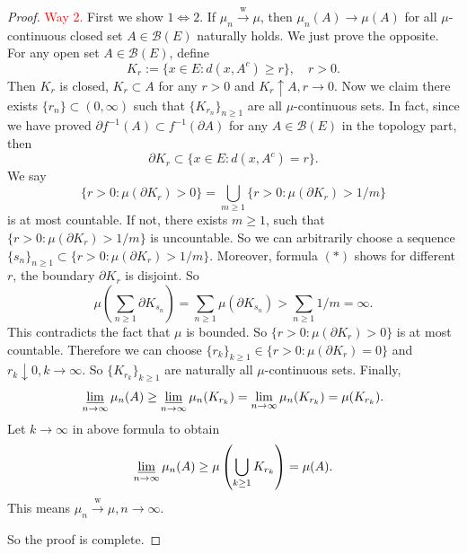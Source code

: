 \documentclass[12pt]{article}
\renewcommand{\b}{\mathscr{B}}
\renewcommand{\(}{\left(}%
\renewcommand{\)}{\right)}%
\renewcommand{\[}{\left[}%
\renewcommand{\]}{\right]}%
\newtheorem{proof}{Proof.}}
\begin{document}
\begin{proof}
    \textcolor{red}{\sffamily Way 2.} First we show $1\Leftrightarrow 2$. If $\mu_n\overset{\mathrm{w}}{\to}\mu$, then $\mu_n(A)\to\mu(A)$ for all $\mu$-continuous closed set $A\in\b(E)$ naturally holds. We just prove the opposite. For any open set $A\in\b(E)$, define
  	\begin{equation*}
  		K_r:=\{x\in E:d(x,A^c)\geq r\},\quad r>0.
  	\end{equation*}
  	Then $K_r$ is closed, $K_r\subset A$ for any $r>0$ and $K_r\uparrow A,r\to 0$. Now we claim there exists $\{r_n\}\subset (0,\infty)$ such that $\{K_{r_n}\}_{n\geq 1}$ are all $\mu$-continuous sets. In fact, since we have proved $\partial f^{-1}(A)\subset f^{-1}(\partial A)$ for any $A\in\b(E)$ in the topology part, then 
  	\begin{equation*}
  		\partial K_r\subset \{x\in E:d(x,A^c)=r\}.\tag{$*$}
  	\end{equation*}
  	We say 
  	\begin{equation*}
  		\{r>0:\mu(\partial K_r)>0\}=\bigcup_{m\geq 1}\{r>0:\mu(\partial K_r)>1/m\}
  	\end{equation*}
  	is at most countable. If not, there exists $m\geq 1$, such that $\{r>0:\mu(\partial K_r)>1/m\}$ is uncountable. So we can arbitrarily choose a sequence $\{s_n\}_{n\geq 1}\subset \{r>0:\mu(\partial K_r)>1/m\}$. Moreover, formula $(*)$ shows for different $r$, the boundary $\partial K_r$ is disjoint. So
  	\begin{equation*}
  		\mu\(\sum_{n\geq 1}\partial K_{s_n} \)=\sum_{n\geq 1}\mu(\partial K_{s_n})>\sum_{n\geq 1}1/m=\infty.
  	\end{equation*}
  	This contradicts the fact that  $\mu$ is bounded. So $\{r>0:\mu(\partial K_r)>0\}$ is at most countable. Therefore we can choose $\{r_k\}_{k\geq 1}\in \{r>0:\mu(\partial K_r)=0\}$ and $r_k\downarrow 0,k\to\infty$. So $\{K_{r_k}\}_{k\geq 1}$ are naturally all $\mu$-continuous sets. Finally,
  	\begin{equation*}
  		\varliminf_{n\to\infty}\mu_n(A)\geq \varliminf_{n\to\infty}\mu_n(K_{r_k})=\lim_{n\to\infty}\mu_n(K_{r_k})=\mu(K_{r_k}).
  	\end{equation*}
  	Let $k\to\infty$ in above formula to obtain
  	\begin{equation*}
  		\varliminf_{n\to\infty}\mu_n(A)\geq \mu\(\bigcup_{k\geq 1}K_{r_k} \)=\mu(A).
  	\end{equation*}
  	This means $\mu_n\overset{\mathrm{w}}{\to}\mu,n\to\infty$.
  	
  	 So the proof is complete.
  \end{proof}
  
\end{document}
